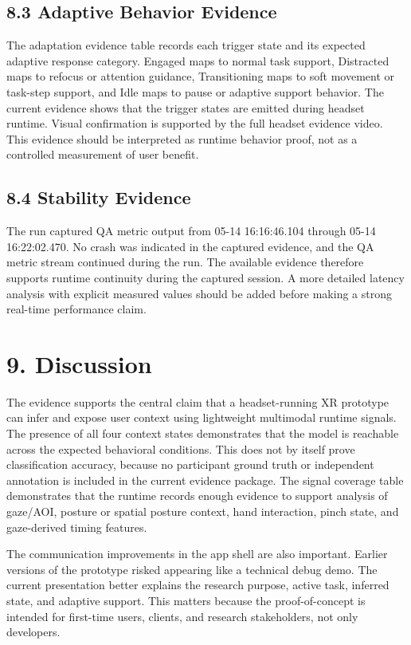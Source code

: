 \documentclass[
  10pt,
]{article}
\begin{document}
\subsection{8.3 Adaptive Behavior
Evidence}\label{adaptive-behavior-evidence}

The adaptation evidence table records each trigger state and its
expected adaptive response category. Engaged maps to normal task
support, Distracted maps to refocus or attention guidance, Transitioning
maps to soft movement or task-step support, and Idle maps to pause or
adaptive support behavior. The current evidence shows that the trigger
states are emitted during headset runtime. Visual confirmation is
supported by the full headset evidence video. This evidence should be
interpreted as runtime behavior proof, not as a controlled measurement
of user benefit.

\subsection{8.4 Stability Evidence}\label{stability-evidence}

The run captured QA metric output from 05-14 16:16:46.104 through 05-14
16:22:02.470. No crash was indicated in the captured evidence, and the
QA metric stream continued during the run. The available evidence
therefore supports runtime continuity during the captured session. A
more detailed latency analysis with explicit measured values should be
added before making a strong real-time performance claim.

\section{9. Discussion}\label{discussion}

The evidence supports the central claim that a headset-running XR
prototype can infer and expose user context using lightweight multimodal
runtime signals. The presence of all four context states demonstrates
that the model is reachable across the expected behavioral conditions.
This does not by itself prove classification accuracy, because no
participant ground truth or independent annotation is included in the
current evidence package. The signal coverage table demonstrates that
the runtime records enough evidence to support analysis of gaze/AOI,
posture or spatial posture context, hand interaction, pinch state, and
gaze-derived timing features.

The communication improvements in the app shell are also important.
Earlier versions of the prototype risked appearing like a technical
debug demo. The current presentation better explains the research
purpose, active task, inferred state, and adaptive support. This matters
because the proof-of-concept is intended for first-time users, clients,
and research stakeholders, not only developers.
\end{document}
